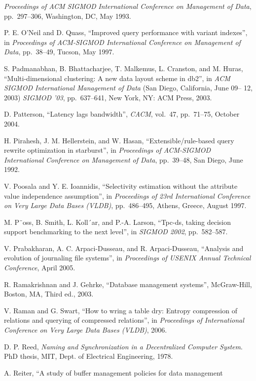 \documentclass[a4paper,11pt,twoside,openright]{book}
\begin{document}
\begin{enumerate}[label={[\arabic*]}]
  \emph{Proceedings of ACM SIGMOD} \emph{International Conference on
  Management of Data}, pp.~297--306, Washington, DC, May 1993.
\item
  P. E. O'Neil and D. Quass, ``Improved query performance with variant
  indexes'', in \emph{Proceedings of ACM-SIGMOD International Conference
  on Management of} \emph{Data}, pp.~38--49, Tucson, May 1997.
\item
  S. Padmanabhan, B. Bhattacharjee, T. Malkemus, L. Cranston, and M.
  Huras, ``Multi-dimensional clustering: A new data layout scheme in
  db2'', in \emph{ACM} \emph{SIGMOD International Management of Data}
  (San Diego, California, June 09-- 12, 2003) \emph{SIGMOD '03},
  pp.~637--641, New York, NY: ACM Press, 2003.
\item
  D. Patterson, ``Latency lags bandwidth'', \emph{CACM}, vol.~47,
  pp.~71--75, October 2004.
\item
  H. Pirahesh, J. M. Hellerstein, and W. Hasan, ``Extensible/rule-based
  query rewrite optimization in starburst'', in \emph{Proceedings of
  ACM-SIGMOD International Conference on Management of Data},
  pp.~39--48, San Diego, June 1992.
\item
  V. Poosala and Y. E. Ioannidis, ``Selectivity estimation without the
  attribute value independence assumption'', in \emph{Proceedings of
  23rd International Conference on Very Large Data Bases (VLDB)},
  pp.~486--495, Athens, Greece, August 1997.
\item
  M. P¨oss, B. Smith, L. Koll´ar, and P.-A. Larson, ``Tpc-ds,
taking decision support benchmarking to the next level'', in
\emph{SIGMOD 2002}, pp.~582--587.
\item
  V. Prabakharan, A. C. Arpaci-Dusseau, and R. Arpaci-Dusseau,
``Analysis and evolution of journaling file systems'', in
\emph{Proceedings of USENIX Annual Technical Conference}, April 2005.
\item
  R. Ramakrishnan and J. Gehrke, ``Database management systems'',
  McGraw-Hill, Boston, MA, Third ed., 2003.
\item
  V. Raman and G. Swart, ``How to wring a table dry: Entropy compression
  of relations and querying of compressed relations'', in
  \emph{Proceedings of International} \emph{Conference on Very Large
  Data Bases (VLDB)}, 2006.
\item
  D. P. Reed, \emph{Naming and Synchronization in a Decentralized
  Computer System}. PhD thesis, MIT, Dept. of Electrical Engineering,
  1978.
\item
  A. Reiter, ``A study of buffer management policies for data management

\end{enumerate}
\end{document}
